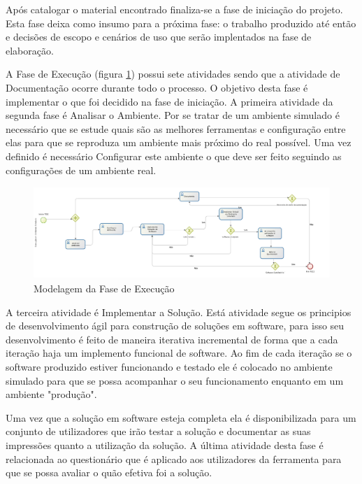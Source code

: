 Após catalogar o material encontrado finaliza-se a fase de iniciação do projeto. Esta fase deixa como insumo para a próxima fase: o trabalho produzido até então e decisões de escopo e cenários de uso que serão implentados na fase de elaboração. 

A Fase de Execução (figura \ref{img:execucao}) possui sete atividades sendo que a atividade de Documentação ocorre durante todo o processo. O objetivo desta fase é implementar o que foi decidido na fase de iniciação. A primeira atividade da segunda fase é Analisar o Ambiente. Por se tratar de um ambiente simulado é necessário que se estude quais são as melhores ferramentas e configuração entre elas para que se reproduza um ambiente mais próximo do real possível. Uma vez definido é necessário Configurar este ambiente o que deve ser feito seguindo as configurações de um ambiente real.
\graphicspath{{figuras/}}
\begin{figure}[h]
\centering
\includegraphics[scale=0.40]{execucao}
\caption{Modelagem da Fase de Execução}
\label{img:execucao}
\end{figure}

A terceira atividade é Implementar a Solução. Está atividade segue os principios de desenvolvimento ágil para construção de soluções em software, para isso seu desenvolvimento é feito de maneira iterativa incremental de forma que a cada iteração haja um implemento funcional de software. Ao fim de cada iteração se o software produzido estiver funcionando e testado ele é colocado no ambiente simulado para que se possa acompanhar o seu funcionamento enquanto em um ambiente "produção".

Uma vez que a solução em software esteja completa ela é disponibilizada para um conjunto de utilizadores que irão testar a solução e documentar as suas impressões quanto a utilização da solução. A última atividade desta fase é relacionada ao questionário que é aplicado aos utilizadores da ferramenta para que se possa avaliar o quão efetiva foi a solução. 

